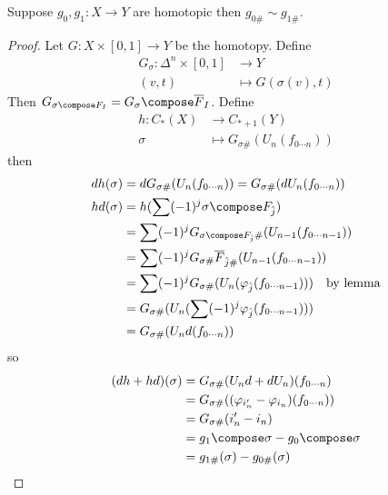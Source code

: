 \documentclass[a4paper]{article}
\begin{document}
\begin{theorem}
  Suppose \(g_0, g_1: X \to Y\) are homotopic then \(g_{0\#} \sim g_{1\#}\).
\end{theorem}

\begin{proof}
  Let \(G: X \times [0, 1] \to Y\) be the homotopy. Define
  \begin{align*}
    G_\sigma: \Delta^n \times [0, 1] &\to Y \\
    (v, t) &\mapsto G(\sigma(v), t)
  \end{align*}
  Then \(G_{\sigma \compose F_I} = G_\sigma \compose \overline F_I\). Define
  \begin{align*}
    h: C_*(X) &\to C_{* + 1}(Y) \\
    \sigma &\mapsto G_{\sigma \#} (U_n (f_{0 \cdots n}))
  \end{align*}
  then
  \begin{align*}
    dh(\sigma) &= d G_{\sigma \#} (U_n (f_{0 \cdots n})) = G_{\sigma \#} (d U_n(f_{0 \cdots n})) \\
    hd(\sigma) &= h (\sum (-1)^j \sigma \compose F_{\hat j}) \\
               &= \sum (-1)^j G_{\sigma \compose F_{\hat j} \#} (U_{n - 1} (f_{0 \cdots n - 1})) \\
               &= \sum (-1)^j G_{\sigma \#} \overline F_{\hat j\#} (U_{n - 1}(f_{0 \cdots n - 1})) \\
               &= \sum (-1)^j G_{\sigma \#} (U_n(\varphi_{\hat j} (f_{0 \cdots n - 1}))) \quad \text{by lemma} \\
               &= G_{\sigma \#} (U_n (\sum (-1)^j \varphi_{\hat j} (f_{0 \cdots n - 1}))) \\
               &= G_{\sigma \#} (U_n d(f_{0 \cdots n}))
  \end{align*}
  so
  \begin{align*}
    (dh + hd)(\sigma) &= G_{\sigma \#} (U_nd + dU_n) (f_{0 \cdots n}) \\
                      &= G_{\sigma \#} ((\varphi_{i_n'} - \varphi_{i_n}) (f_{0 \cdots n})) \\
                      &= G_{\sigma \#} (i_n' - i_n) \\
                      &= g_1 \compose \sigma - g_0 \compose \sigma \\
                      &= g_{1\#}(\sigma) - g_{0\#}(\sigma)
  \end{align*}
\end{proof}





\printindex
\end{document}

